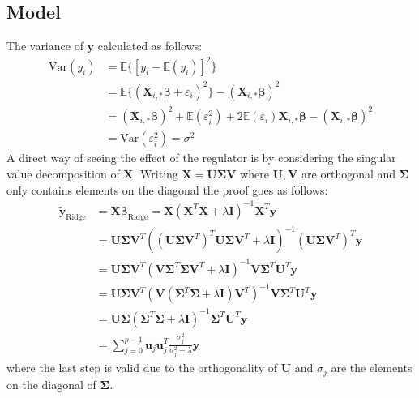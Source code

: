 \documentclass[%
reprint,
amsmath,amssymb,
aps,
pra,
]{revtex4-2}
\begin{document}
\subsection{Model}
The variance of $\bm y$ calculated as follows:
\begin{align*}
	\text{Var}(y_i)&=\mathbb{E}\{[y_i-\mathbb{E}(y_i)]^2\}\\
	&=\mathbb{E}\{(\bm X_{i,*}\bm\beta+\varepsilon_i)^2\}-(\bm X_{i,*}\bm\beta)^2\\
	&=(\bm X_{i,*}\bm\beta)^2+\mathbb{E}(\varepsilon_i^2)+2\mathbb{E}(\varepsilon_i)\bm X_{i,*}\bm\beta-(\bm X_{i,*}\bm\beta)^2\\
	&=\text{Var}(\varepsilon_i^2)=\sigma^2
\end{align*}
A direct way of seeing the effect of the regulator is by considering the singular value decomposition of $\bm X$. Writing $\bm X=\bm U\bm \Sigma\bm V$ where $\bm U,\bm V$ are orthogonal and $\bm \Sigma$ only contains elements on the diagonal the proof goes as follows:
\begin{align*}
	\tilde{\bm{y}}_\text{Ridge}&=\bm{X\beta}_\text{Ridge}=\bm{X}(\bm{X}^T\bm{X}+\lambda\bm I)^{-1}\bm{X}^T\bm{y}\\
	&=\bm{U\Sigma V}^T((\bm{U\Sigma V}^T)^T\bm{U\Sigma V}^T+\lambda\bm I)^{-1}(\bm{U\Sigma V}^T)^T\bm{y}\\
	&=\bm{U\Sigma V}^T(\bm{V}\bm{\Sigma}^T\bm{\Sigma}\bm{V}^T+\lambda\bm I)^{-1}\bm{V}\bm{\Sigma}^T\bm{U}^T\bm{y}\\
	&=\bm{U\Sigma V}^T(\bm{V}({\bm\Sigma}^T\bm{\Sigma}+\lambda\bm I)\bm{V}^T)^{-1}\bm{V}\bm{\Sigma}^T\bm{U}^T\bm{y}\\
	&=\bm{U\Sigma }({\bm\Sigma}^T\bm{\Sigma}+\lambda\bm I)^{-1}\bm{\Sigma}^T\bm{U}^T\bm{y}\\
	&=\sum_{j=0}^{p-1}\bm{u}_j\bm{u}_j^T\frac{\sigma_j^2}{\sigma_j^2+\lambda}\bm{y}
\end{align*}
where the last step is valid due to the orthogonality of $\bm U$ and $\sigma_j$ are the elements on the diagonal of $\bm\Sigma$.
\end{document}
